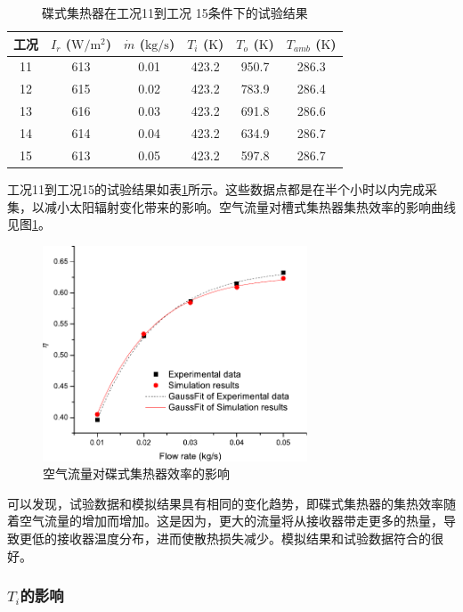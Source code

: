 \begin{table}[htbp]\footnotesize
	\caption{碟式集热器在工况11到工况 15条件下的试验结果}
	\begin{center}
	\begin{tabular}{cccccc}
		\toprule
		工况	& $I_r$ ($\mathrm{W/m^2}$)	&	$\dot{m}$ ($\mathrm{kg/s}$)			&	$T_i$ ($\mathrm{K}$)	&	$T_o$ ($\mathrm{K}$)		&	$T_{amb}$ ($\mathrm{K}$)\\
		\midrule
		11	&	613	&	0.01	&	423.2	&	950.7	&	286.3\\
		12	&	615	&	0.02	&	423.2	&	783.9	&	286.4\\
		13	&	616	&	0.03	&	423.2	&	691.8	&	286.6	\\
		14	&	614	&	0.04	&	423.2	&	634.9	&	286.7\\
		15	&	613	&	0.05	&	423.2	&	597.8	&	286.7\\
		\bottomrule
	\end{tabular}
	\end{center}
	\label{tab:ResultOfDish2}
\end{table}
工况11到工况15的试验结果如表\ref{tab:ResultOfDish2}所示。这些数据点都是在半个小时以内完成采集，以减小太阳辐射变化带来的影响。空气流量对槽式集热器集热效率的影响曲线见图\ref{fig:q_m-eta-dish}。

\begin{figure}[!ht]
\centering
\includegraphics[width=0.7\textwidth]{fig/q_m-eta-dish}
\caption{空气流量对碟式集热器效率的影响}
\label{fig:q_m-eta-dish}
\end{figure}

可以发现，试验数据和模拟结果具有相同的变化趋势，即碟式集热器的集热效率随着空气流量的增加而增加。这是因为，更大的流量将从接收器带走更多的热量，导致更低的接收器温度分布，进而使散热损失减少。模拟结果和试验数据符合的很好。

\subsubsection{$T_i$的影响}

